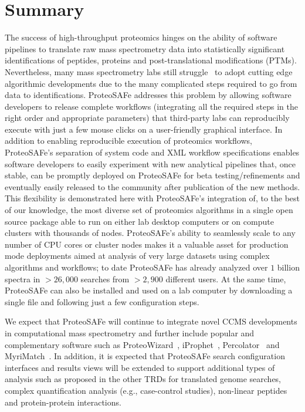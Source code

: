 \documentclass[arial,11pt]{article}
\newcommand{\SF}[1]{\textsf{#1}}
\newcommand{\SYSTEM}[0]{\SF{ProteoSAFe}\xspace}
\begin{document}
\section{Summary}

The success of high-throughput proteomics hinges on the ability of software pipelines to translate raw mass spectrometry data into statistically significant identifications of peptides, proteins and post-translational modifications (PTMs). Nevertheless, many mass spectrometry labs still struggle~\cite{Bell:2009} to adopt cutting edge algorithmic developments due to the many complicated steps required to go from data to identifications. \SYSTEM addresses this problem by allowing software developers to release complete workflows (integrating all the required steps in the right order and appropriate parameters) that third-party labs can reproducibly execute with just a few mouse clicks on a user-friendly graphical interface. In addition to enabling reproducible execution of proteomics workflows, \SYSTEM's separation of system code and XML workflow specifications enables software developers to easily experiment with new analytical pipelines that, once stable, can be promptly deployed on \SYSTEM for beta testing/refinements and eventually easily released to the community after publication of the new methods. This flexibility is demonstrated here with \SYSTEM's integration of, to the best of our knowledge, the most diverse set of proteomics algorithms in a single open source package able to run on either lab desktop computers or on compute clusters with thousands of nodes. \SYSTEM's ability to seamlessly scale to any number of CPU cores or cluster nodes makes it a valuable asset for production mode deployments aimed at analysis of very large datasets using complex algorithms and workflows; to date \SYSTEM has already analyzed over $1$ billion spectra in $>26,000$ searches from $>2,900$ different users.  At the same time, \SYSTEM can also be installed and used on a lab computer by downloading a single file and following just a few configuration steps.

We expect that \SYSTEM will continue to integrate novel CCMS developments in computational mass spectrometry and further include popular and complementary software such as ProteoWizard~\cite{Kessner:2008}, iProphet~\cite{Shteynberg:2011}, Percolator~\cite{Spivak:2009} and MyriMatch~\cite{Tabb:2007}. In addition, it is expected that \SYSTEM search configuration interfaces and results views will be extended to support additional types of analysis such as proposed in the other TRDs for translated genome searches, complex quantification analysis (e.g., case-control studies), non-linear peptides and protein-protein interactions.
\end{document}
